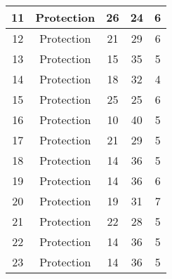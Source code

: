 \documentclass[results.tex]{subfiles}
\begin{document}
\begin{center}
\begin{tabular}{| c || c | c | c | c |}
            \hline
            11                      & Protection                   & 26                     & 24                      & 6                    \\
            \hline
            12                      & Protection                   & 21                     & 29                      & 6                    \\
            \hline
            13                      & Protection                   & 15                     & 35                      & 5                    \\
            \hline
            14                      & Protection                   & 18                     & 32                      & 4                    \\
            \hline
            15                      & Protection                   & 25                     & 25                      & 6                    \\
            \hline
            16                      & Protection                   & 10                     & 40                      & 5                    \\
            \hline
            17                      & Protection                   & 21                     & 29                      & 5                    \\
            \hline
            18                      & Protection                   & 14                     & 36                      & 5                    \\
            \hline
            19                      & Protection                   & 14                     & 36                      & 6                    \\
            \hline
            20                      & Protection                   & 19                     & 31                      & 7                    \\
            \hline
            21                      & Protection                   & 22                     & 28                      & 5                    \\
            \hline
            22                      & Protection                   & 14                     & 36                      & 5                    \\
            \hline
            23                      & Protection                   & 14                     & 36                      & 5                    \\

\end{tabular}
\end{center}
\end{document}
